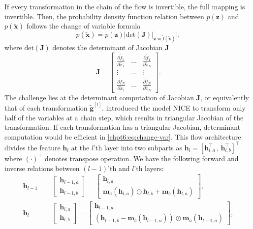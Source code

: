 If every transformation in the chain of the flow is invertible, the full mapping is invertible.
Then, the probability density function relation between $p(\bm{z})$ and $p(\tilde{\bm{x}})$ follows the change of variable formula
\begin{equation}\label{chpt6:eq:change-var}
  p(\tilde{\bm{x}}) =  p(\bm{z}) \bigg| \mathrm{det}(\bm{J}) \big|_{\bm{z}=\tilde{\bm{f}}(\tilde{\bm{x}})}\bigg|,
\end{equation}
where $\mathrm{det}(\bm{J})$ denotes the determinant of Jacobian $\bm{J}$
\begin{equation}
  \bm{J} = \left[
    \begin{array}{ccc}
      \frac{\partial \tilde{f}_1}{\partial \tilde{x}_1} & \hdots & \frac{\partial \tilde{f}_1}{\partial \tilde{x}_N} \\
      \vdots & \hdots & \vdots \\
      \frac{\partial \tilde{f}_N}{\partial \tilde{x}_1} & \hdots & \frac{\partial \tilde{f}_N}{\partial \tilde{x}_N}
    \end{array}
  \right].
\end{equation}
The challenge lies at the determinant computation of Jacobian $\bm{J}$, or equivalently that of each transformation $\tilde{\bm{g}}^{[l]}$. \cite{DBLP:journals/corr/DinhKB14} introduced the model NICE to transform only half of the variables at a chain step, which results in triangular Jacobian of the transformation. If each transformation has a triangular Jacobian, determinant computation would be efficient in \eqref{chpt6:eq:change-var}.
This flow architecture divides the feature $\bm{h}_l$ at the $l$'th layer into two subparts as
$\bm{h}_l = [\bm{h}_{l,a}^{\intercal} \, , \, \bm{h}_{l,b}^{\intercal}]^{\intercal}$ where
$(\cdot)^{\intercal}$ denotes transpose operation. We have the following forward and inverse relations between $(l-1)$'th and $l$'th layers:
\begin{align}\label{chpt6:eq-gl-coupling}
  \bm{h}_{l-1} &=
                 \begin{bmatrix}
                   \bm{h}_{l-1,a}\\
                   \bm{h}_{l-1,b}
                 \end{bmatrix}
  =
  \begin{bmatrix}
    \bm{h}_{l,a}\\
    \bm{m}_a(\bm{h}_{l,a})\odot \bm{h}_{l,b} + \bm{m}_b(\bm{h}_{l,a})
  \end{bmatrix},\nonumber\\
  \bm{h}_{l} &=
               \begin{bmatrix}
                 \bm{h}_{l,a}\\
                 \bm{h}_{l,b}
               \end{bmatrix}
  =
  \begin{bmatrix}
    \bm{h}_{l-1,a}\\
    \left(  \bm{h}_{l-1,b} - \bm{m}_b(\bm{h}_{l-1,a}) \right)\oslash \bm{m}_a(\bm{h}_{l-1,a}) 
  \end{bmatrix}, 
\end{align}
